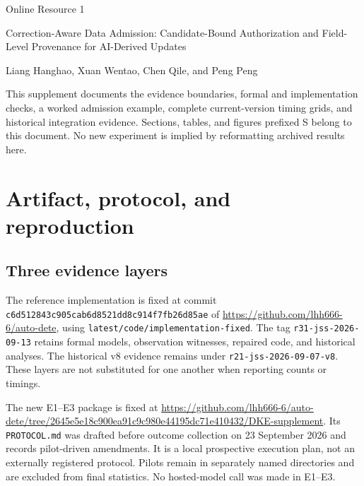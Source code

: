 \documentclass[11pt,a4paper]{article}
\newcommand{\code}[1]{\nolinkurl{#1}}
\begin{document}
\begin{center}
{\Large Online Resource 1}\par\medskip
{\large Correction-Aware Data Admission: Candidate-Bound Authorization and Field-Level Provenance for AI-Derived Updates}\par\medskip
Liang Hanghao, Xuan Wentao, Chen Qile, and Peng Peng
\par{}
\end{center}

This supplement documents the evidence boundaries, formal and implementation checks, a worked admission example, complete current-version timing grids, and historical integration evidence. Sections, tables, and figures prefixed S belong to this document. No new experiment is implied by reformatting archived results here.

\section{Artifact, protocol, and reproduction}
\label{app:artifact}

\subsection{Three evidence layers}

The reference implementation is fixed at commit \code{c6d512843c905cab6d8521dd8c914f7fb26d85ae} of \url{https://github.com/lhh666-6/auto-dete}, using \code{latest/code/implementation-fixed}. The tag \code{r31-jss-2026-09-13} retains formal models, observation witnesses, repaired code, and historical analyses. The historical v8 evidence remains under \code{r21-jss-2026-09-07-v8}. These layers are not substituted for one another when reporting counts or timings.

The new E1--E3 package is fixed at \url{https://github.com/lhh666-6/auto-dete/tree/2645e5e18c900ea91c9c980e44195dc71e410432/DKE-supplement}. Its \code{PROTOCOL.md} was drafted before outcome collection on 23 September 2026 and records pilot-driven amendments. It is a local prospective execution plan, not an externally registered protocol. Pilots remain in separately named directories and are excluded from final statistics. No hosted-model call was made in E1--E3.
\end{document}
